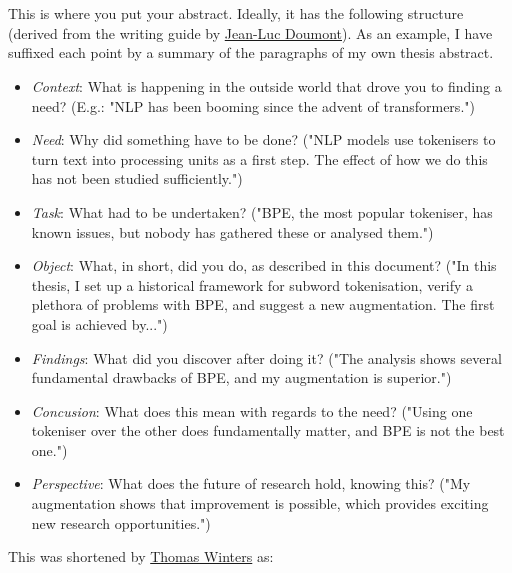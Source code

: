 \chapter[Abstract]{}
\vspace{-2.5em}\makebox[\linewidth]{\resizebox{0.9\linewidth}{1pt}{$\bullet$}}\bigskip

This is where you put your abstract. Ideally, it has the following structure (derived from the writing guide by \href{https://www.principiae.be/pdfs/TM&Th-2.0-summary.pdf}{Jean-Luc Doumont}). As an example, I have suffixed each point by a summary of the paragraphs of my own thesis abstract.
\begin{itemize}
    \item \emph{Context}: What is happening in the outside world that drove you to finding a need? (E.g.: "NLP has been booming since the advent of transformers.")
    \item \emph{Need}: Why did something have to be done? ("NLP models use tokenisers to turn text into processing units as a first step. The effect of how we do this has not been studied sufficiently.")
    \item \emph{Task}: What had to be undertaken? ("BPE, the most popular tokeniser, has known issues, but nobody has gathered these or analysed them.")
    \item \emph{Object}: What, in short, did you do, as described in this document? ("In this thesis, I set up a historical framework for subword tokenisation, verify a plethora of problems with BPE, and suggest a new augmentation. The first goal is achieved by...")

    \item \emph{Findings}: What did you discover after doing it? ("The analysis shows several fundamental drawbacks of BPE, and my augmentation is superior.")
    \item \emph{Concusion}: What does this mean with regards to the need? ("Using one tokeniser over the other does fundamentally matter, and BPE is not the best one.")
    \item \emph{Perspective}: What does the future of research hold, knowing this? ("My augmentation shows that improvement is possible, which provides exciting new research opportunities.")
\end{itemize}

This was shortened by \href{https://thomaswinters.be/}{Thomas Winters} as:

